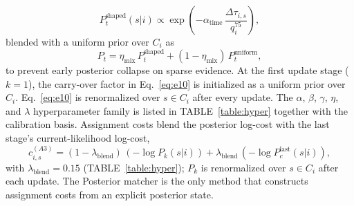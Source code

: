 \documentclass{ieeeaccess}
\newif\ifhighlight \highlightfalse
\DeclareRobustCommand{\revised}[1]{\ifhighlight{\color{blue}#1}\else{\color{.}#1}\fi}
\begin{document}
    \begin{equation}\label{eq:shaped}
        P_t^{\text{shaped}}(s|i)\propto\exp\!\left(-\alpha_{\text{time}}\,\frac{\Delta\tau_{i,s}}{q^{75}_i}\right),
    \end{equation}
    blended with a uniform prior over $C_i$ as
    \begin{equation}\label{eq:ptblend}
        P_t = \eta_{\text{mix}}\,P_t^{\text{shaped}} + (1-\eta_{\text{mix}})\,P_t^{\text{uniform}},
    \end{equation}
    to prevent early posterior collapse on sparse evidence.
    At the first update stage ($k = 1$), the carry-over factor in Eq.~\eqref{eq:e10} is initialized as a uniform prior over $C_i$.
    Eq.~\eqref{eq:e10} is renormalized over $s \in C_i$ after every update.
    The $\alpha$, $\beta$, $\gamma$, \revised{$\eta$,} and $\lambda$ hyperparameter family is listed in TABLE~\ref{table:hyper} together with the calibration basis.
    Assignment costs blend the posterior log-cost with the last stage's current-likelihood log-cost,
    \begin{equation}\label{eq:e11}
        c^{(A3)}_{i,s} = (1 - \lambda_{\text{blend}})\,(-\log P_k(s|i)) + \lambda_{\text{blend}}\,(-\log P_c^{\text{last}}(s|i)),
    \end{equation}
    with $\lambda_{\text{blend}} = 0.15$ (TABLE~\ref{table:hyper}); $P_k$ is renormalized over $s \in C_i$ after each update.
    The Posterior matcher is the only method that constructs assignment costs from an explicit posterior state.
\end{document}
